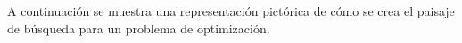 A continuación se muestra una representación pictórica de cómo se crea el paisaje de búsqueda para un problema de optimización.
\begin{figure}[H]
\centering
{}

\end{figure}
